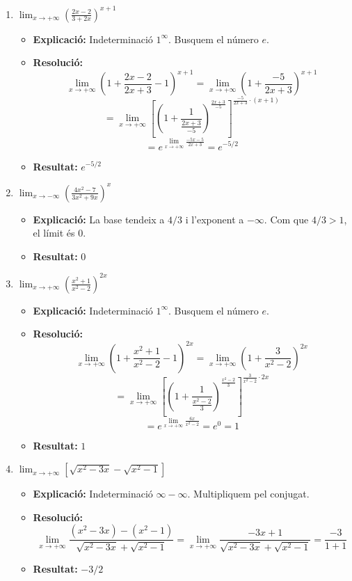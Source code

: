 \documentclass[12pt,a4paper]{article}
\begin{document}
\begin{enumerate}[label=\textbf{7.\arabic*.}]
    \item $\lim_{x \to +\infty} \left( \frac{2x-2}{3+2x} \right)^{x+1}$
        \begin{itemize}
            \item \textbf{Explicació:} Indeterminació $1^\infty$. Busquem el número $e$.
            \item \textbf{Resolució:}
            $$ \lim_{x \to +\infty} \left( 1 + \frac{2x-2}{2x+3} - 1 \right)^{x+1} = \lim_{x \to +\infty} \left( 1 + \frac{-5}{2x+3} \right)^{x+1} $$
            $$ = \lim_{x \to +\infty} \left[ \left( 1 + \frac{1}{\frac{2x+3}{-5}} \right)^{\frac{2x+3}{-5}} \right]^{\frac{-5}{2x+3} \cdot (x+1)} $$
            $$ = e^{\lim_{x \to +\infty} \frac{-5x-5}{2x+3}} = e^{-5/2} $$
            \item \textbf{Resultat:} $e^{-5/2}$
        \end{itemize}

    \item $\lim_{x \to -\infty} \left( \frac{4x^2-7}{3x^2+9x} \right)^{x}$
        \begin{itemize}
            \item \textbf{Explicació:} La base tendeix a $4/3$ i l'exponent a $-\infty$. Com que $4/3 > 1$, el límit és $0$.
            \item \textbf{Resultat:} $0$
        \end{itemize}

    \item $\lim_{x \to +\infty} \left( \frac{x^2+1}{x^2-2} \right)^{2x}$
        \begin{itemize}
            \item \textbf{Explicació:} Indeterminació $1^\infty$. Busquem el número $e$.
            \item \textbf{Resolució:}
            $$ \lim_{x \to +\infty} \left( 1 + \frac{x^2+1}{x^2-2} - 1 \right)^{2x} = \lim_{x \to +\infty} \left( 1 + \frac{3}{x^2-2} \right)^{2x} $$
            $$ = \lim_{x \to +\infty} \left[ \left( 1 + \frac{1}{\frac{x^2-2}{3}} \right)^{\frac{x^2-2}{3}} \right]^{\frac{3}{x^2-2} \cdot 2x} $$
            $$ = e^{\lim_{x \to +\infty} \frac{6x}{x^2-2}} = e^0 = 1 $$
            \item \textbf{Resultat:} $1$
        \end{itemize}

    \item $\lim_{x \to +\infty} \left[ \sqrt{x^2-3x} - \sqrt{x^2-1} \right]$
        \begin{itemize}
            \item \textbf{Explicació:} Indeterminació $\infty - \infty$. Multipliquem pel conjugat.
            \item \textbf{Resolució:}
            $$ \lim_{x \to +\infty} \frac{(x^2-3x) - (x^2-1)}{\sqrt{x^2-3x} + \sqrt{x^2-1}} = \lim_{x \to +\infty} \frac{-3x+1}{\sqrt{x^2-3x} + \sqrt{x^2-1}} = \frac{-3}{1+1} $$
            \item \textbf{Resultat:} $-3/2$
        \end{itemize}


\end{enumerate}
\end{document}
